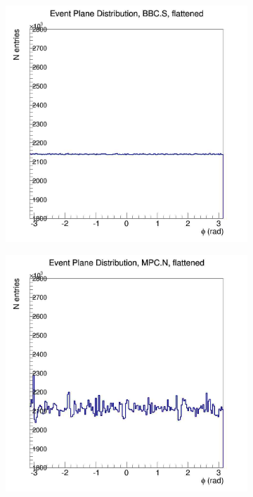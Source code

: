\begin{figure}[htbp!]
\begin{subfigure}[p]{0.4\textwidth}
    \includegraphics[width=1\textwidth]{EPflattening/flatbbcs.jpg}
    \end{subfigure}
    \begin{subfigure}[p]{0.4\textwidth}
    \includegraphics[width=1\textwidth]{EPflattening/flatmpcn.jpg}

\end{subfigure}
\end{figure}
